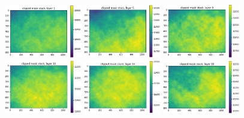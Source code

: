 \documentclass[letterpaper,11pt]{article}
\begin{document}
\begin{figure}[!ht]
\centering
\includegraphics[width=0.3\textwidth]{images/measuring_flatfield_corrections/clipped_mask_stack_layers/clipped_mask_stack_layer_1}
\includegraphics[width=0.3\textwidth]{images/measuring_flatfield_corrections/clipped_mask_stack_layers/clipped_mask_stack_layer_5}
\includegraphics[width=0.3\textwidth]{images/measuring_flatfield_corrections/clipped_mask_stack_layers/clipped_mask_stack_layer_9}
\includegraphics[width=0.3\textwidth]{images/measuring_flatfield_corrections/clipped_mask_stack_layers/clipped_mask_stack_layer_10}
\includegraphics[width=0.3\textwidth]{images/measuring_flatfield_corrections/clipped_mask_stack_layers/clipped_mask_stack_layer_14}
\includegraphics[width=0.3\textwidth]{images/measuring_flatfield_corrections/clipped_mask_stack_layers/clipped_mask_stack_layer_18}

\end{figure}
\end{document}
